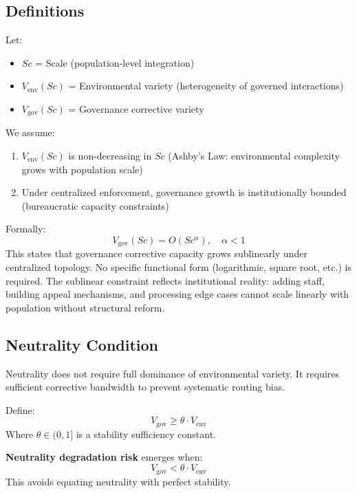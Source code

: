 \documentclass{article}
\begin{document}
\subsection{Definitions}

Let:
\begin{itemize}[noitemsep]
    \item $Sc$ = Scale (population-level integration)
    \item $V_{\text{env}}(Sc)$ = Environmental variety (heterogeneity of governed interactions)
    \item $V_{\text{gov}}(Sc)$ = Governance corrective variety
\end{itemize}

We assume:
\begin{enumerate}[noitemsep]
    \item $V_{\text{env}}(Sc)$ is non-decreasing in $Sc$ (Ashby's Law: environmental complexity grows with population scale)
    \item Under centralized enforcement, governance growth is institutionally bounded (bureaucratic capacity constraints)
\end{enumerate}

Formally:
\begin{equation}
V_{\text{gov}}(Sc) = O(Sc^{\alpha}), \quad \alpha < 1
\end{equation}
This states that governance corrective capacity grows sublinearly under centralized topology. No specific functional form (logarithmic, square root, etc.) is required. The sublinear constraint reflects institutional reality: adding staff, building appeal mechanisms, and processing edge cases cannot scale linearly with population without structural reform.

\subsection{Neutrality Condition}

Neutrality does not require full dominance of environmental variety. It requires sufficient corrective bandwidth to prevent systematic routing bias.

Define:
\begin{equation}
V_{\text{gov}} \geq \theta \cdot V_{\text{env}}
\end{equation}
Where $\theta \in (0,1]$ is a stability sufficiency constant.

\textbf{Neutrality degradation risk} emerges when:
\begin{equation}
V_{\text{gov}} < \theta \cdot V_{\text{env}}
\end{equation}
This avoids equating neutrality with perfect stability.
\end{document}
